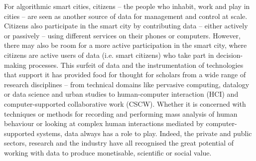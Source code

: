 \begin{introduction}
For algorithmic smart cities, citizens -- the people who inhabit, work and play in cities -- are seen as another source of data for management and control at scale. Citizens also participate in the smart city by contributing data -- either actively or passively -- using different services on their phones or computers. However, there may also be room for a more active participation in the smart city, where citizens are active users of data (i.e. smart citizens) who take part in decision-making processes. This surfeit of data and the instrumentation of technologies that support it has provided food for thought for scholars from a wide range of research disciplines -- from technical domains like pervasive computing, datalogy or data science and urban studies to human-computer interaction (HCI) and computer-supported collaborative work (CSCW). Whether it is concerned with techniques or methods for recording and performing mass analysis of human behaviour or looking at complex human interactions mediated by computer-supported systems, data always has a role to play. Indeed, the private and public sectors, research and the industry have all recognised the great potential of working with data to produce monetisable, scientific or social value.


\end{introduction}
